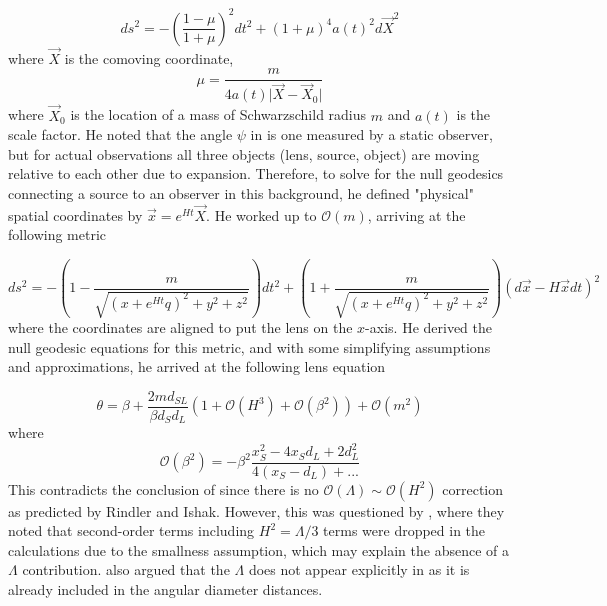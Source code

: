 \begin{equation}
  ds^2 = - \left ( \frac{1 - \mu}{1 + \mu} \right )^2 dt^2 + (1 + \mu)^4 a(t)^2 d\vec{X}^2
  \label{eq:mcvittie-metric}
\end{equation}
where $\vec{X}$ is the comoving coordinate, 
\begin{equation}
  \mu = \frac{m}{4 a(t) \vert \vec{X} - \vec{X}_0 \vert }
  \label{eq:mcvittie-metric2}
\end{equation}
where $\vec{X}_0$ is the location of a mass of Schwarzschild radius $m$ and $a(t)$ is the scale factor. He noted that the angle $\psi$ in \citet{Rindler2007} is one measured by a static observer, but for actual observations all three objects (lens, source, object) are moving relative to each other due to expansion. Therefore, to solve for the null geodesics connecting a source to an observer in this background, he defined "physical" spatial coordinates by $\vec{x} = e^{Ht} \vec{X}$. He worked up to $\mathcal{O}(m)$, arriving at the following metric

\begin{equation}
  ds^2 = -\left ( 1 - \frac{m}{\sqrt{(x + e^{Ht}q)^2 + y^2 + z^2}} \right ) dt^2 + (1 + \frac{m}{\sqrt{(x + e^{Ht}q)^2 + y^2 + z^2}})(d\vec{x} - H\vec{x}dt)^2
  \label{eq:park-equation}
\end{equation}
where the coordinates are aligned to put the lens on the $x$-axis. He derived the null geodesic equations for this metric, and with some simplifying assumptions and approximations, he arrived at the following lens equation

\begin{equation}
  \theta = \beta + \frac{2md_{SL}}{\beta d_S d_L} \left ( 1 + \mathcal{O}(H^3) + \mathcal{O}(\beta^2) \right ) + \mathcal{O}(m^2)
  \label{eq:park-equation-theta}
\end{equation}
where
\begin{equation}
  \mathcal{O}(\beta^2) = - \beta^2 \frac{x_S^{2} - 4 x_S d_L + 2d_L^2}{4(x_S - d_L) + ...}
\end{equation}
This contradicts the conclusion of \citet{Rindler2007} since there is no $\mathcal{O}(\Lambda) \sim \mathcal{O}(H^2)$ correction as predicted by Rindler and Ishak. However, this was questioned by \citet{Ishak2008}, where they noted that second-order terms including $H^2 = \Lambda / 3$ terms were dropped in the calculations due to the smallness assumption, which may explain the absence of a $\Lambda$ contribution. \citet{Sereno2008} also argued that the $\Lambda$ does not appear explicitly in \citet{Park2008,Khriplovich2008} as it is already included in the angular diameter distances. 

